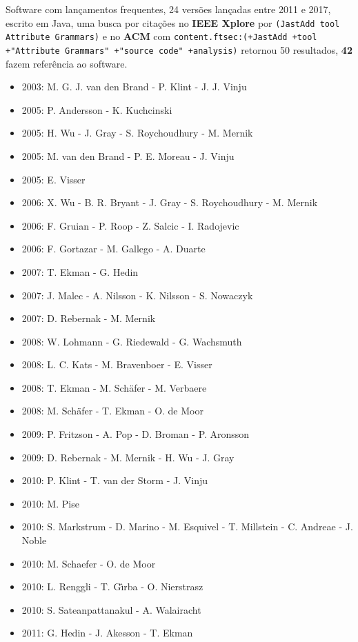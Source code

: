 Software com lançamentos frequentes,
24 versões lançadas
entre 2011 e 2017,
escrito em Java,
uma busca por citações no {\bf IEEE Xplore} por
\texttt{(JastAdd tool Attribute Grammars)}
e no {\bf ACM} com
\texttt{content.ftsec:(+JastAdd +tool +"Attribute Grammars" +"source code" +analysis)}
retornou
50 resultados,
{\bf 42} fazem referência ao software.

\begin{itemize}
\item 2003: M. G. J. van den Brand - P. Klint - J. J. Vinju
\item 2005: P. Andersson - K. Kuchcinski
\item 2005: H. Wu - J. Gray - S. Roychoudhury - M. Mernik
\item 2005: M. van den Brand - P. E. Moreau - J. Vinju
\item 2005: E. Visser
\item 2006: X. Wu - B. R. Bryant - J. Gray - S. Roychoudhury - M. Mernik
\item 2006: F. Gruian - P. Roop - Z. Salcic - I. Radojevic
\item 2006: F. Gortazar - M. Gallego - A. Duarte
\item 2007: T. Ekman - G. Hedin
\item 2007: J. Malec - A. Nilsson - K. Nilsson - S. Nowaczyk
\item 2007: D. Rebernak - M. Mernik
\item 2008: W. Lohmann - G. Riedewald - G. Wachsmuth
\item 2008: L. C. Kats - M. Bravenboer - E. Visser
\item 2008: T. Ekman - M. Sch\"{a}fer - M. Verbaere
\item 2008: M. Sch\"{a}fer - T. Ekman - O. de Moor
\item 2009: P. Fritzson - A. Pop - D. Broman - P. Aronsson
\item 2009: D. Rebernak - M. Mernik - H. Wu - J. Gray
\item 2010: P. Klint - T. van der Storm - J. Vinju
\item 2010: M. Pise
\item 2010: S. Markstrum - D. Marino - M. Esquivel - T. Millstein - C. Andreae - J. Noble
\item 2010: M. Schaefer - O. de Moor
\item 2010: L. Renggli - T. G\^{\i}rba - O. Nierstrasz
\item 2010: S. Sateanpattanakul - A. Walairacht
\item 2011: G. Hedin - J. Akesson - T. Ekman

\end{itemize}
